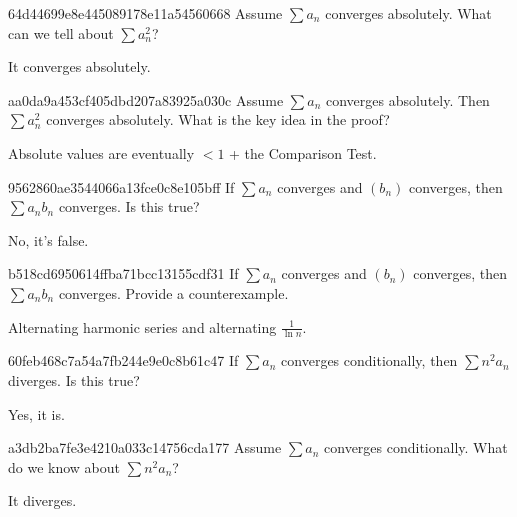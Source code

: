 \begin{note}{64d44699e8e445089178e11a54560668}
    Assume \({ \sum a_n }\) converges absolutely.
    What can we tell about \({ \sum a_n^2 }\)?

    \begin{cloze}{1}
        It converges absolutely.
    \end{cloze}
\end{note}

\begin{note}{aa0da9a453cf405dbd207a83925a030c}
    Assume \({ \sum a_n }\) converges absolutely. Then \({ \sum a_n^2 }\) converges absolutely.
    What is the key idea in the proof?

    \begin{cloze}{1}
        Absolute values are eventually \({ < 1 }\) + the Comparison Test.
    \end{cloze}
\end{note}

\begin{note}{9562860ae3544066a13fce0c8e105bff}
    If \({ \sum a_n }\) converges and \({ (b_n) }\) converges, then \({ \sum a_n b_n }\) converges.
    Is this true?

    \begin{cloze}{1}
        No, it's false.
    \end{cloze}
\end{note}

\begin{note}{b518cd6950614ffba71bcc13155cdf31}
    If \({ \sum a_n }\) converges and \({ (b_n) }\) converges, then \({ \sum a_n b_n }\) converges.
    Provide a counterexample.

    \begin{cloze}{1}
        Alternating harmonic series and alternating \({ \frac{1}{\ln n} }\).
    \end{cloze}
\end{note}

\begin{note}{60feb468c7a54a7fb244e9e0c8b61c47}
    If \({ \sum a_n }\) converges conditionally, then \({ \sum n^2 a_n }\) diverges.
    Is this true?

    \begin{cloze}{1}
        Yes, it is.
    \end{cloze}
\end{note}

\begin{note}{a3db2ba7fe3e4210a033c14756cda177}
    Assume \({ \sum a_n }\) converges conditionally.
    What do we know about \({ \sum n^2 a_n }\)?

    \begin{cloze}{1}
        It diverges.
    \end{cloze}
\end{note}

